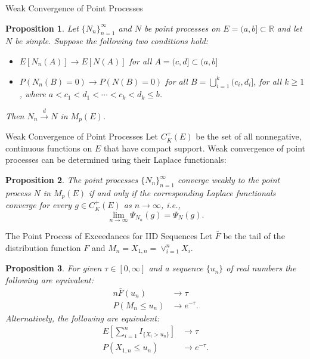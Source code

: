 \documentclass{beamer}
\newtheorem{proposition}{Proposition}
\begin{document}
\begin{frame}{Weak Convergence of Point Processes}
    \begin{proposition}
        Let $\{N_n\}_{n = 1}^{\infty}$ and $N$ be point processes on $E = (a, b] \subset \mathbb{R}$ and let $N$ be simple. Suppose the following two conditions hold:
        \begin{itemize}
            \item $E[N_n(A)] \to E[N(A)]$ for all $A = (c, d] \subset (a, b]$
            \item $P(N_n(B) = 0) \to P(N(B) = 0)$ for all $B = \bigcup_{i = 1}^k (c_i, d_i]$, for all $k \ge 1$, where $a < c_1 < d_1 < \cdots < c_k < d_k \le b$.
        \end{itemize}
        Then $N_n \xrightarrow{d} N$ in $M_p(E)$.
    \end{proposition}
\end{frame}

\begin{frame}{Weak Convergence of Point Processes}
    Let $C_K^+(E)$ be the set of all nonnegative, continuous functions on $E$ that have compact support. Weak convergence of point processes can be determined using their Laplace functionals:
    \begin{proposition}
        The point processes $\{N_n\}_{n = 1}^{\infty}$ converge weakly to the point process $N$ in $M_p(E)$ if and only if the corresponding Laplace functionals converge for every $g \in C_K^+(E)$ as $n \to \infty$, i.e.,
        \[
        \lim_{n \to \infty} \Psi_{N_n}(g) = \Psi_N(g).
        \]
    \end{proposition}
\end{frame}

\begin{frame}{The Point Process of Exceedances for IID Sequences}
    Let $\bar{F}$ be the tail of the distribution function $F$ and $M_n = X_{1, n} = \vee_{i = 1}^n X_i$.
    \begin{proposition}
        For given $\tau \in [0, \infty]$ and a sequence $\{u_n\}$ of real numbers the following are equivalent:
        \begin{align*}
            n\bar{F}(u_n) &\to \tau \\
            P(M_n \le u_n) &\to e^{-\tau}.
        \end{align*}
        Alternatively, the following are equivalent:
        \begin{align*}
            E\left[\sum_{i = 1}^n I_{\{X_i > u_n\}}\right] &\to \tau \\
            P(X_{1, n} \le u_n) &\to e^{-\tau}.
        \end{align*}
    \end{proposition}
\end{frame}
\end{document}
